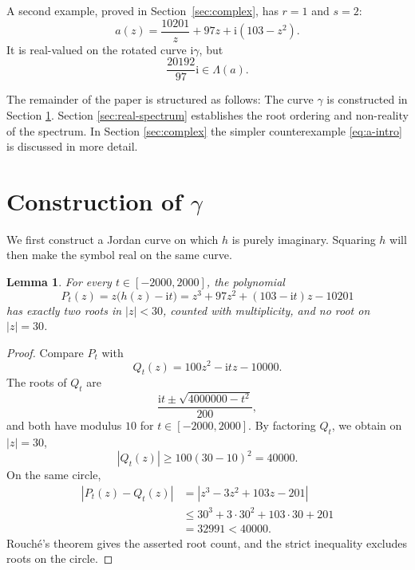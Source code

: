 \documentclass[11pt,a4paper]{amsart}
\newtheorem{lemma}[theorem]{Lemma}
\theoremstyle{remark}
\numberwithin{equation}{section}
\newcommand{\ii}{\mathrm i}
\begin{document}
A second example, proved in Section~\ref{sec:complex}, has \(r=1\) and \(s=2\):
\begin{equation}
 a(z)=\frac{10201}{z}+97z+\ii(103-z^2).
 \label{eq:a-intro}
\end{equation}
It is real-valued on the rotated curve \(\ii\gamma\), but
\begin{equation}
 \frac{20192}{97}\ii\in\Lambda(a).
 \label{eq:explicit-nonreal}
\end{equation}

The remainder of the paper is structured as follows: The curve $\gamma$ is constructed in Section \ref{sec:curve}. Section \ref{sec:real-spectrum} establishes the root ordering and non-reality of the spectrum. In Section \ref{sec:complex} the simpler counterexample \eqref{eq:a-intro} is discussed in more detail.



\section{Construction of \texorpdfstring{$\gamma$}{γ}}
\label{sec:curve}

We first construct
a Jordan curve on which \(h\) is purely imaginary. Squaring \(h\) will then make the symbol real on the same curve.

\begin{lemma}
\label{lem:rouche}
For every \(t\in[-2000,2000]\), the polynomial
\begin{equation}
 P_t(z)=z\bigl(h(z)-\ii t\bigr)
       =z^3+97z^2+(103-\ii t)z-10201
 \label{eq:Pt}
\end{equation}
has exactly two roots in \(|z|<30\), counted with multiplicity, and no root on \(|z|=30\).
\end{lemma}

\begin{proof}
Compare \(P_t\) with
\[
 Q_t(z)=100z^2-\ii tz-10000.
\]
The roots of \(Q_t\) are
\[
 \frac{\ii t\pm\sqrt{4000000-t^2}}{200},
\]
and both have modulus \(10\) for $t\in[-2000,2000]$. By factoring $Q_t$, we obtain on \(|z|=30\),
\[
 |Q_t(z)|\geq100(30-10)^2=40000.
\]
On the same circle,
\begin{align*}
 |P_t(z)-Q_t(z)|
  &=|z^3-3z^2+103z-201|\\
  &\leq30^3+3\cdot30^2+103\cdot30+201\\
  &=32991<40000.
\end{align*}
Rouch\'e's theorem gives the asserted root count, and the strict inequality excludes roots on the circle.
\end{proof}
\end{document}
